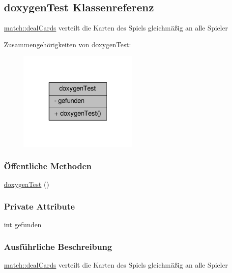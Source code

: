 \hypertarget{classdoxygen_test}{\subsection{doxygen\-Test Klassenreferenz}
\label{classdoxygen_test}
}


\hyperlink{classmatch_ab4c417d094231254db1d0fb16788d9d1}{match\-::deal\-Cards} verteilt die Karten des Spiels gleichmäßig an alle Spieler  




Zusammengehörigkeiten von doxygen\-Test\-:
\nopagebreak
\begin{figure}[H]
\begin{center}
\leavevmode
\includegraphics[width=166pt]{d1/d0d/classdoxygen_test__coll__graph}
\end{center}
\end{figure}
\subsubsection*{Öffentliche Methoden}
\begin{DoxyCompactItemize}
\item 
\hyperlink{classdoxygen_test_a30850c05261f6a497685e695205dd999}{doxygen\-Test} ()
\end{DoxyCompactItemize}
\subsubsection*{Private Attribute}
\begin{DoxyCompactItemize}
\item 
int \hyperlink{classdoxygen_test_ad64c43fe0cf4adae044e5bee06288080}{gefunden}
\end{DoxyCompactItemize}


\subsubsection{Ausführliche Beschreibung}
\hyperlink{classmatch_ab4c417d094231254db1d0fb16788d9d1}{match\-::deal\-Cards} verteilt die Karten des Spiels gleichmäßig an alle Spieler 



